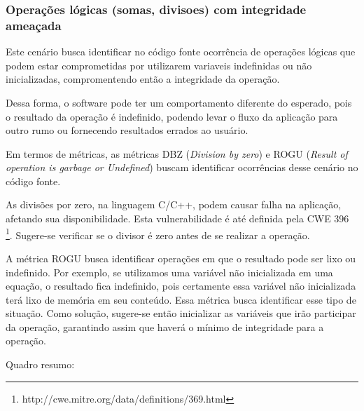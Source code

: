 %
%
%



\subsubsection{Operações lógicas (somas, divisoes) com integridade ameaçada}

Este cenário busca identificar no código fonte ocorrência de operações lógicas que podem estar comprometidas por utilizarem variaveis indefinidas ou não inicializadas, compromentendo então a integridade da operação.

Dessa forma, o software pode ter um comportamento diferente do esperado, pois o resultado da operação é indefinido, podendo levar o fluxo da aplicação para outro rumo ou fornecendo resultados errados ao usuário.

Em termos de métricas, as métricas DBZ (\emph{Division by zero}) e ROGU (\emph{Result of operation is garbage or Undefined}) buscam identificar ocorrências desse cenário no código fonte. 

As divisões por zero, na linguagem C/C++, podem causar falha na aplicação, afetando sua disponibilidade. Esta vulnerabilidade é até definida pela CWE 396 \footnote{http://cwe.mitre.org/data/definitions/369.html}. Sugere-se verificar se o divisor é zero antes de se realizar a operação.

A métrica ROGU busca identificar operações em que o resultado pode ser lixo ou indefinido. Por exemplo, se utilizamos uma variável não inicializada em uma equação, o resultado fica indefinido, pois certamente essa variável não inicializada terá lixo de memória em seu conteúdo. Essa métrica busca identificar esse tipo de situação. Como solução, sugere-se então inicializar as variáveis que irão participar da operação, garantindo assim que haverá o mínimo de integridade para a operação.

 Quadro resumo:

